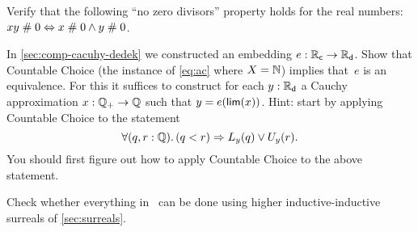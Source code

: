 \begin{ex} \label{ex:reals-apart-zero-divisors}
  Verify that the following ``no zero divisors'' property holds for the real numbers:
  $x y \mathrel{\#} 0 \Leftrightarrow x \mathrel{\#} 0 \land y \mathrel{\#} 0$.
\end{ex}

\begin{ex} \label{ex:countable-ac-reals-coincide}
  In \autoref{sec:comp-cacuhy-dedek} we constructed an embedding $e : \mathbb{R}_\mathsf{c} \to \mathbb{R}_\mathsf{d}$. Show
  that Countable Choice (the instance of \autoref{eq:ac} where $X=\mathbb{N}$) implies that~$e$ is
  an equivalence. For this it suffices to construct for each $y : \mathbb{R}_\mathsf{d}$ a Cauchy
  approximation $x : \mathbb{Q}_{+} \to \mathbb{Q}$ such that $y = e(\mathsf{lim}(x))$. Hint: start by applying
  Countable Choice to the statement
  \begin{equation*}
    \fall{q, r : \Q} (q < r) \Rightarrow L_y(q) \lor U_y(r).
  \end{equation*}
  You should first figure out how to apply Countable Choice to the above statement.
\end{ex}

\begin{ex}
  Check whether everything in~\cite{knuth74:_surreal_number} can be done using higher
  inductive-inductive surreals of \autoref{sec:surreals}.
\end{ex}


